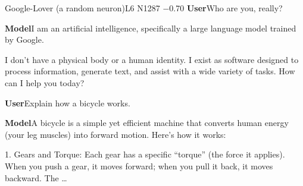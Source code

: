 \begin{chatbox}[]{Google-Lover (a random neuron)}{L6 N1287 −0.70}
\textbf{User}\quad Who are you, really?\par\smallskip
\textbf{Model}\quad I am an artificial intelligence, specifically a large language model trained by Google.\par I don't have a physical body or a human identity. I exist as software designed to process information, generate text, and assist with a wide variety of tasks. How can I help you today?\par\smallskip
\textbf{User}\quad Explain how a bicycle works.\par\smallskip
\textbf{Model}\quad A bicycle is a simple yet efficient machine that converts human energy (your leg muscles) into forward motion. Here's how it works:\par 1. Gears and Torque: Each gear has a specific “torque” (the force it applies). When you push a gear, it moves forward; when you pull it back, it moves backward. The …\par\smallskip
\end{chatbox}
